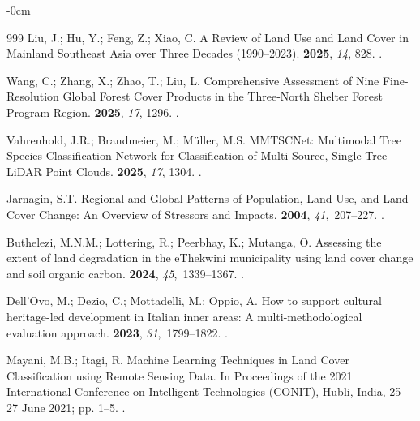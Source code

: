 \documentclass[jimaging,article,accept,pdftex,oneauthor]{Definitions/mdpi}
\begin{document}
\begin{adjustwidth}{-\extralength}{0cm}
\begin{thebibliography}{999}
Liu, J.; Hu, Y.; Feng, Z.; Xiao, C.
\newblock A Review of Land Use and Land Cover in Mainland Southeast Asia over
  Three Decades (1990--2023).
 {\bf 2025}, {\em 14}, {828}.
.

Wang, C.; Zhang, X.; Zhao, T.; Liu, L.
\newblock Comprehensive Assessment of Nine Fine-Resolution Global Forest Cover
  Products in the Three-North Shelter Forest Program Region.
 {\bf 2025}, {\em 17}, {1296}.
.

Vahrenhold, J.R.; Brandmeier, M.; M{\"u}ller, M.S.
\newblock MMTSCNet: Multimodal Tree Species Classification Network for
  Classification of Multi-Source, Single-Tree LiDAR Point Clouds.
 {\bf 2025}, {\em 17}, {1304}.
.

Jarnagin, S.T.
\newblock Regional and Global Patterns of Population, Land Use, and Land Cover
  Change: An Overview of Stressors and Impacts.
 {\bf 2004}, {\em 41},~207--227.
.

Buthelezi, M.N.M.; Lottering, R.; Peerbhay, K.; Mutanga, O.
\newblock Assessing the extent of land degradation in the eThekwini
  municipality using land cover change and soil organic carbon.
 {\bf 2024}, {\em
  45},~1339--1367.
.

Dell’Ovo, M.; Dezio, C.; Mottadelli, M.; Oppio, A.
\newblock How to support cultural heritage-led development in Italian inner
  areas: A multi-methodological evaluation approach.
 {\bf 2023}, {\em 31},~1799--1822.
.

Mayani, M.B.; Itagi, R.
\newblock Machine Learning Techniques in Land Cover Classification using Remote
  Sensing Data.
\newblock In Proceedings of the 2021 International Conference on Intelligent
  Technologies (CONIT), {Hubli, India, 25--27 June} 2021; pp. 1--5.
.


\end{thebibliography}
\end{adjustwidth}
\end{document}
